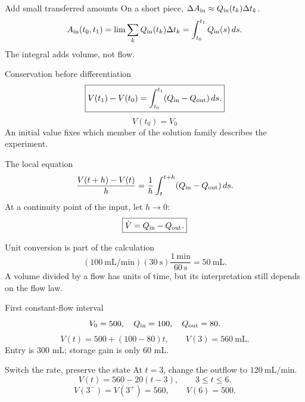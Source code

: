 \documentclass[aspectratio=169,11pt]{beamer}
\newcommand{\notestarget}{notes.pdf}\newcommand{\noteslabel}{Notes}
\begin{document}
\begin{frame}[t,fragile,label=slide-add-small-transferred-amounts]{Add small transferred amounts}
On a short piece, $\Delta A_{\rm in}\approx Q_{\rm in}(t_k)\Delta t_k$.\pause{}\[A_{\rm in}(t_0,t_1)=\lim\sum_k Q_{\rm in}(t_k)\Delta t_k=\int_{t_0}^{t_1}Q_{\rm in}(s)\,ds.\]The integral adds volume, not flow.
\end{frame}
\renewcommand{\notestarget}{notes.pdf\#note-from-transferred-amounts-to-an-integral-balance}
\begin{frame}[t,fragile,label=slide-conservation-before-differentiation]{Conservation before differentiation}
\[\boxed{V(t_1)-V(t_0)=\int_{t_0}^{t_1}(Q_{\rm in}-Q_{\rm out})\,ds.}\]\pause{}\[V(t_0)=V_0\]An initial value fixes which member of the solution family describes the experiment.
\end{frame}
\renewcommand{\notestarget}{notes.pdf\#note-from-transferred-amounts-to-an-integral-balance}
\begin{frame}[t,fragile,label=slide-the-local-equation]{The local equation}
\[\frac{V(t+h)-V(t)}h=\frac1h\int_t^{t+h}(Q_{\rm in}-Q_{\rm out})\,ds.\]\pause{} At a continuity point of the input, let $h\to0$:\[\boxed{\dot V=Q_{\rm in}-Q_{\rm out}.}\]
\end{frame}
\renewcommand{\notestarget}{notes.pdf\#note-from-transferred-amounts-to-an-integral-balance}
\begin{frame}[t,fragile,label=slide-unit-conversion-is-part-of-the-calculation]{Unit conversion is part of the calculation}
\[(100\ \mathrm{mL}/\mathrm{min})(30\ \mathrm{s})\frac{1\ \mathrm{min}}{60\ \mathrm{s}}=50\ \mathrm{mL}.\]\pause{} A volume divided by a flow has units of time, but its interpretation still depends on the flow law.
\end{frame}
\renewcommand{\notestarget}{notes.pdf\#note-an-exact-switched-flow-experiment}
\begin{frame}[t,fragile,label=slide-first-constant-flow-interval]{First constant-flow interval}
\[V_0=500,\quad Q_{\rm in}=100,\quad Q_{\rm out}=80.\]\pause{}\[V(t)=500+(100-80)t,\qquad V(3)=560\ \mathrm{mL}.\]Entry is $300$ mL; storage gain is only $60$ mL.
\end{frame}
\renewcommand{\notestarget}{notes.pdf\#note-an-exact-switched-flow-experiment}
\begin{frame}[t,fragile,label=slide-switch-the-rate-preserve-the-state]{Switch the rate, preserve the state}
At $t=3$, change the outflow to $120\ \mathrm{mL}/\mathrm{min}$.\pause{}\[V(t)=560-20(t-3),\qquad3\leq t\leq6.\]\[V(3^-)=V(3^+)=560,\qquad V(6)=500.\]
\end{frame}
\end{document}
